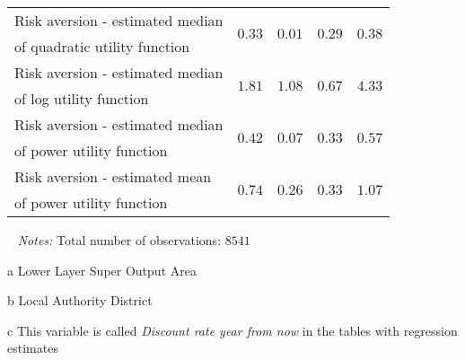 \documentclass[a4paper,12pt]{article}
\begin{document}
{\begin{threeparttable}
\begin{small}
\begin{tabular}{lrrrr}
 
Risk aversion - estimated median&\multirow{2}{*}{$0.33$}&\multirow{2}{*}{$0.01$}&\multirow{2}{*}{$0.29$}&\multirow{2}{*}{$0.38$}\\
\vspace{0.15cm} \hspace{0.4cm}of quadratic utility function\\ 
 Risk aversion - estimated median&\multirow{2}{*}{$1.81$}&\multirow{2}{*}{$1.08$}&\multirow{2}{*}{$0.67$}&\multirow{2}{*}{$4.33$}\\
\vspace{0.15cm} \hspace{0.4cm}of log utility function\\ 
 Risk aversion - estimated median&\multirow{2}{*}{$0.42$}&\multirow{2}{*}{$0.07$}&\multirow{2}{*}{$0.33$}&\multirow{2}{*}{$0.57$}\\
\vspace{0.15cm} \hspace{0.4cm}of power utility function\\ 
  Risk aversion - estimated mean&\multirow{2}{*}{$0.74$}&\multirow{2}{*}{$0.26$}&\multirow{2}{*}{$0.33$}&\multirow{2}{*}{$1.07$}\\
\vspace{0.15cm} \hspace{0.4cm}of power utility function\\ 
 
\hline
\hline
\end{tabular} 
\end{small}
 \begin{tablenotes}
  \begin{footnotesize}
     \item[~]\textit{Notes:} Total number of observations: $8541$\vspace{-0.35cm}
          \begin{adjustwidth}{0.7cm}{}  

      \item[a] Lower Layer Super Output Area
   \item[b] Local Authority District
  \item[c]This variable is called \textit{Discount rate year from now} in the tables with regression estimates 
    \end{adjustwidth}
\singlespacing
  \end{footnotesize}
\end{tablenotes}
  \end{threeparttable} 
\par}

\pagebreak
\end{document}
